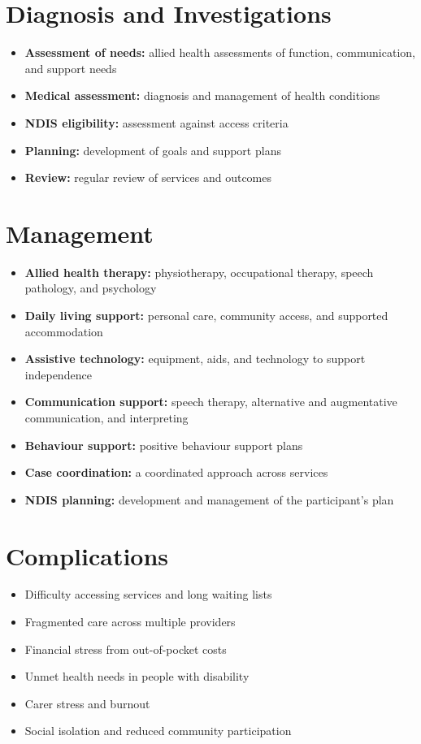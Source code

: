 \section*{Diagnosis and Investigations}
\begin{itemize}
    \item \textbf{Assessment of needs:} allied health assessments of function, communication, and support needs
    \item \textbf{Medical assessment:} diagnosis and management of health conditions
    \item \textbf{NDIS eligibility:} assessment against access criteria
    \item \textbf{Planning:} development of goals and support plans
    \item \textbf{Review:} regular review of services and outcomes
\end{itemize}

\section*{Management}
\begin{itemize}
    \item \textbf{Allied health therapy:} physiotherapy, occupational therapy, speech pathology, and psychology
    \item \textbf{Daily living support:} personal care, community access, and supported accommodation
    \item \textbf{Assistive technology:} equipment, aids, and technology to support independence
    \item \textbf{Communication support:} speech therapy, alternative and augmentative communication, and interpreting
    \item \textbf{Behaviour support:} positive behaviour support plans
    \item \textbf{Case coordination:} a coordinated approach across services
    \item \textbf{NDIS planning:} development and management of the participant's plan
\end{itemize}

\section*{Complications}
\begin{itemize}
    \item Difficulty accessing services and long waiting lists
    \item Fragmented care across multiple providers
    \item Financial stress from out-of-pocket costs
    \item Unmet health needs in people with disability
    \item Carer stress and burnout
    \item Social isolation and reduced community participation
\end{itemize}

